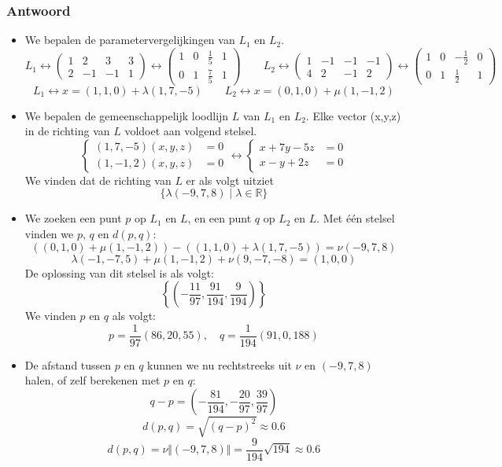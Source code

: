 \documentclass[main.tex]{subfiles}
\begin{document}
\subsubsection*{Antwoord}
\begin{itemize}
\item We bepalen de parametervergelijkingen van $L_{1}$ en $L_{2}$.
  \[ 
  L_{1} \leftrightarrow
  \begin{pmatrix}
    1 & 2 & 3 & 3\\
    2 & -1 & -1 & 1
  \end{pmatrix}
  \longleftrightarrow
  \begin{pmatrix}
    1 & 0 & \frac{1}{5} & 1\\
    0 & 1 & \frac{7}{5} & 1
  \end{pmatrix}
  \qquad
  L_{2} \leftrightarrow
  \begin{pmatrix}
    1 & -1 & -1 & -1\\
    4 & 2 & -1 & 2
  \end{pmatrix}
  \longleftrightarrow
  \begin{pmatrix}
    1 & 0 & -\frac{1}{2} & 0\\
    0 & 1 & \frac{1}{2} & 1
  \end{pmatrix}
  \]
  \[
  L_{1} \leftrightarrow x = (1,1,0) + \lambda (1,7,-5)
  \qquad
  L_{2} \leftrightarrow x = (0,1,0) + \mu (1,-1,2)
  \]
\item We bepalen de gemeenschappelijk loodlijn $L$ van $L_{1}$ en $L_{2}$.
  Elke vector (x,y,z) in de richting van $L$ voldoet aan volgend stelsel.
  \[
  \left\{
    \begin{array}{cc}
      (1,7,-5)(x,y,z) &= 0\\
      (1,-1,2)(x,y,z) &= 0
    \end{array}
  \right.
  \longleftrightarrow
  \left\{
    \begin{array}{cc}
      x+7y-5z &= 0\\
      x-y+2z  &= 0
    \end{array}
  \right.
  \]
  We vinden dat de richting van $L$ er als volgt uitziet
  \[
  \{ \lambda(-9,7,8) \mid \lambda \in \mathbb{R} \}
  \]
\item We zoeken een punt $p$ op $L_{1}$ en $L$, en een punt $q$ op $L_{2}$ en $L$.
  Met \'e\'en stelsel vinden we $p$, $q$ en $d(p,q)$:
  \[ \left((0,1,0) + \mu (1,-1,2)\right) - \left( (1,1,0) + \lambda (1,7,-5)\right) = \nu (-9,7,8) \]
  \[ \lambda (-1,-7,5) + \mu (1,-1,2) + \nu (9,-7,-8) = (1,0,0) \]
  De oplossing van dit stelsel is als volgt:
  \[
  \left\{ \left( -\frac{11}{97}, \frac{91}{194}, \frac{9}{194} \right) \right\}
  \]
  We vinden $p$ en $q$ als volgt:
  \[ p = \frac{1}{97}(86,20,55), \quad q= \frac{1}{194}(91,0,188)\]
\item De afstand tussen $p$ en $q$ kunnen we nu rechtstreeks uit $\nu$ en $(-9,7,8)$ halen, of zelf berekenen met $p$ en $q$:
  \[ q-p = \left(-\frac{81}{194}, -\frac{20}{97}, \frac{39}{97}\right)\]
  \[ d(p,q) = \sqrt{(q-p)^{2}} \approx 0.6 \]
  \[ d(p,q) = \nu \Vert (-9,7,8) \Vert= \frac{9}{194}\sqrt{194} \approx 0.6 \]
\end{itemize}
\end{document}

